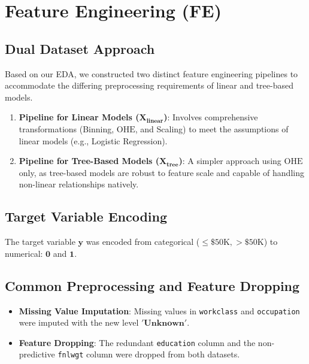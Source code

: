 \chapter{Feature Engineering (FE)}
\label{cp:fe}

\section{Dual Dataset Approach}
Based on our EDA, we constructed two distinct feature engineering pipelines to accommodate the differing preprocessing requirements of linear and tree-based models. 
\begin{enumerate}
    \item \textbf{Pipeline for Linear Models ($\mathbf{X_{\text{linear}}}$)}: Involves comprehensive transformations (Binning, $\text{OHE}$, and Scaling) to meet the assumptions of linear models (e.g., Logistic Regression).
    \item \textbf{Pipeline for Tree-Based Models ($\mathbf{X_{\text{tree}}}$)}: A simpler approach using $\text{OHE}$ only, as tree-based models are robust to feature scale and capable of handling non-linear relationships natively.
\end{enumerate}

\vspace{1 \baselineskip}
\section{Target Variable Encoding}
The target variable $\mathbf{y}$ was encoded from categorical ($\le\$50\text{K}, >\$50\text{K}$) to numerical: $\mathbf{0}$ and $\mathbf{1}$.

\vspace{1 \baselineskip}
\section{Common Preprocessing and Feature Dropping}
\begin{itemize}
    \item \textbf{Missing Value Imputation}: Missing values in \texttt{workclass} and \texttt{occupation} were imputed with the new level $\mathbf{'Unknown'}$.
    \item \textbf{Feature Dropping}: The redundant \texttt{education} column and the non-predictive \texttt{fnlwgt} column were dropped from both datasets.
\end{itemize}

\vspace{1 \baselineskip}
